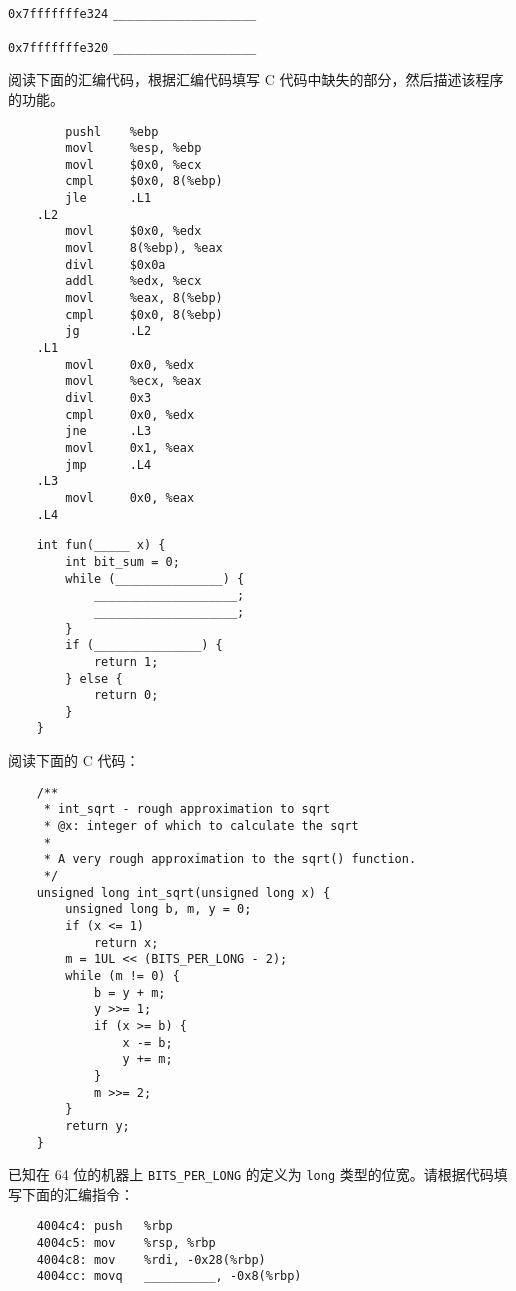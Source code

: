 \begin{problems}
\begin{compactdesc}
            \item[\texttt{0x7fffffffe324}] \verb|____________________|
            \item[\texttt{0x7fffffffe320}] \verb|____________________|
        \end{compactdesc}
         阅读下面的汇编代码，根据汇编代码填写 C 代码中缺失的部分，然后描述该程序的功能。
        \begin{verbatim}
        pushl    %ebp
        movl     %esp, %ebp
        movl     $0x0, %ecx
        cmpl     $0x0, 8(%ebp)
        jle      .L1
    .L2
        movl     $0x0, %edx
        movl     8(%ebp), %eax
        divl     $0x0a
        addl     %edx, %ecx
        movl     %eax, 8(%ebp)
        cmpl     $0x0, 8(%ebp)
        jg       .L2
    .L1
        movl     0x0, %edx
        movl     %ecx, %eax
        divl     0x3
        cmpl     0x0, %edx
        jne      .L3
        movl     0x1, %eax
        jmp      .L4
    .L3
        movl     0x0, %eax
    .L4 
        \end{verbatim}
        \begin{verbatim}
    int fun(_____ x) {
        int bit_sum = 0;
        while (_______________) {
            ____________________;
            ____________________;
        }
        if (_______________) {
            return 1;
        } else {
            return 0;
        }
    }
        \end{verbatim}
         阅读下面的 C 代码：
        \begin{verbatim}
    /**
     * int_sqrt - rough approximation to sqrt
     * @x: integer of which to calculate the sqrt
     *
     * A very rough approximation to the sqrt() function.
     */ 
    unsigned long int_sqrt(unsigned long x) {
        unsigned long b, m, y = 0;
        if (x <= 1) 
            return x; 
        m = 1UL << (BITS_PER_LONG - 2); 
        while (m != 0) {
            b = y + m; 
            y >>= 1; 
            if (x >= b) {
                x -= b;
                y += m; 
            } 
            m >>= 2; 
        } 
        return y; 
    } 
        \end{verbatim}
        已知在 64 位的机器上 \verb|BITS_PER_LONG| 的定义为 \verb|long| 类型的位宽。请根据代码填写下面的汇编指令：
        \begin{verbatim}
    4004c4: push   %rbp
    4004c5: mov    %rsp, %rbp
    4004c8: mov    %rdi, -0x28(%rbp)
    4004cc: movq   __________, -0x8(%rbp)

\end{verbatim}
\end{problems}
